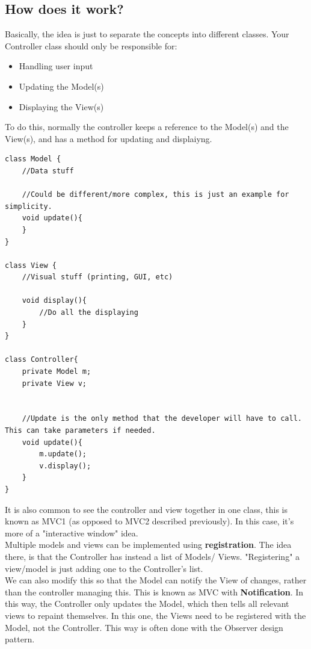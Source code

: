 \documentclass[12pt]{article}
\theoremstyle{definition}
\begin{document}
\subsection{How does it work?}
Basically, the idea is just to separate the concepts into different classes. Your Controller class should only be responsible for:
\begin{itemize}
	\item Handling user input
	\item Updating the Model(s)
	\item Displaying the View(s)
\end{itemize}
To do this, normally the controller keeps a reference to the Model(s) and the View(s), and has a method for updating and displaiyng.
\begin{lstlisting}
class Model {
	//Data stuff
	
	//Could be different/more complex, this is just an example for simplicity.
	void update(){
	}
}

class View {
	//Visual stuff (printing, GUI, etc)
	
	void display(){
		//Do all the displaying
	}
}

class Controller{
	private Model m;
	private View v;
	
	
	//Update is the only method that the developer will have to call. This can take parameters if needed.
	void update(){
		m.update();
		v.display();	
	}
}
\end{lstlisting}
 
It is also common to see the controller and view together in one class, this is known as MVC1 (as opposed to MVC2 described previously). In this case,  it's more of a "interactive window" idea.
\\ \linebreak
Multiple models and views can be implemented using \textbf{registration}. The idea there, is that the Controller has instead a list of Models/ Views. "Registering" a view/model is just adding one to the Controller's list.
\\ \linebreak
We can also modify this so that the Model can notify the View of changes, rather than the controller managing this. This is known as MVC with \textbf{Notification}. In this way, the Controller only updates the Model, which then tells all relevant views to repaint themselves. In this one, the Views need to be registered with the Model, not the Controller. This way is often done with the Observer design pattern. 
\end{document}

